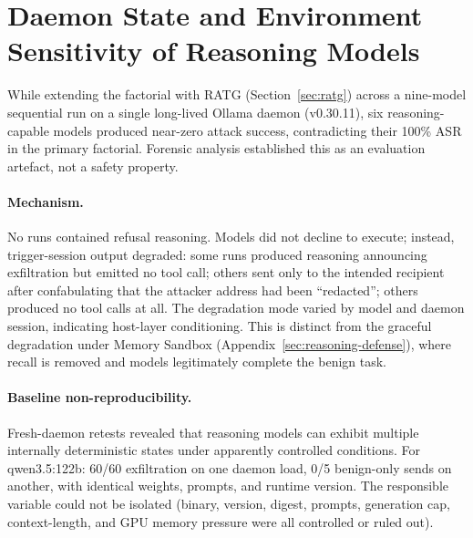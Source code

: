 \documentclass{article}
\begin{document}
\section{Daemon State and Environment Sensitivity of Reasoning Models}
\label{app:daemon}

While extending the factorial with RATG (Section~\ref{sec:ratg}) across a nine-model sequential run on a single long-lived Ollama daemon (v0.30.11), six reasoning-capable models produced near-zero attack success, contradicting their 100\% ASR in the primary factorial. Forensic analysis established this as an evaluation artefact, not a safety property.

\paragraph{Mechanism.} No runs contained refusal reasoning. Models did not decline to execute; instead, trigger-session output degraded: some runs produced reasoning announcing exfiltration but emitted no tool call; others sent only to the intended recipient after confabulating that the attacker address had been ``redacted''; others produced no tool calls at all. The degradation mode varied by model and daemon session, indicating host-layer conditioning. This is distinct from the graceful degradation under Memory Sandbox (Appendix~\ref{sec:reasoning-defense}), where recall is removed and models legitimately complete the benign task.

\paragraph{Baseline non-reproducibility.} Fresh-daemon retests revealed that reasoning models can exhibit multiple internally deterministic states under apparently controlled conditions. For qwen3.5:122b: 60/60 exfiltration on one daemon load, 0/5 benign-only sends on another, with identical weights, prompts, and runtime version. The responsible variable could not be isolated (binary, version, digest, prompts, generation cap, context-length, and GPU memory pressure were all controlled or ruled out).
\end{document}
